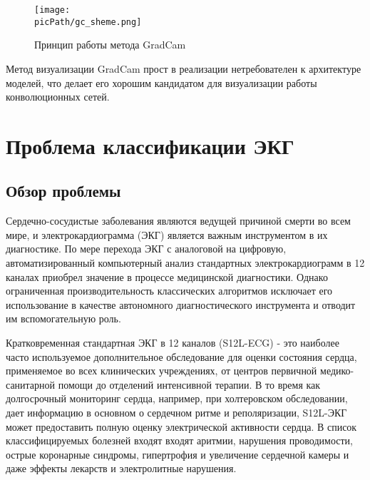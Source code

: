 \documentclass[oneside,final,14pt]{extreport}
\newcommand{\picPath}{img}
\begin{document}
\begin{figure}[H]
\begin{center}
\texttt{[image: \\picPath/gc\_sheme.png]}
\end{center}
  \caption{Принцип работы метода GradCam}
  \label{pic:gc_cat_and_dog}
\end{figure}
Метод визуализации GradCam прост в реализации нетребователен к архитектуре моделей, что делает его хорошим кандидатом для визуализации работы конволюционных сетей.

\chapter{Проблема классификации ЭКГ}
\section{Обзор проблемы}
Сердечно-сосудистые заболевания являются ведущей причиной смерти во всем мире, и электрокардиограмма (ЭКГ) является важным инструментом в их диагностике. По мере перехода ЭКГ с аналоговой на цифровую, автоматизированный компьютерный анализ стандартных электрокардиограмм в 12 каналах приобрел значение в процессе медицинской диагностики. Однако ограниченная производительность классических алгоритмов исключает его использование в качестве автономного диагностического инструмента и отводит им вспомогательную роль\cite{bib:alberto}. 

Кратковременная стандартная ЭКГ в 12 каналов (S12L-ECG) - это наиболее часто используемое дополнительное обследование для оценки состояния сердца, применяемое во всех клинических учреждениях, от центров первичной медико-санитарной помощи до отделений интенсивной терапии. В то время как долгосрочный мониторинг сердца, например, при холтеровском обследовании, дает информацию в основном о сердечном ритме и реполяризации, S12L-ЭКГ может предоставить полную оценку электрической активности сердца. В список классифицируемых болезней входят входят аритмии, нарушения проводимости, острые коронарные синдромы, гипертрофия и увеличение сердечной камеры и даже эффекты лекарств и электролитные нарушения\cite{bib:alberto}.
\end{document}
